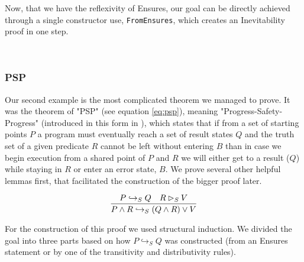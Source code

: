 Now, that we have the reflexivity of Ensures, our goal can be directly achieved through a single constructor use, \verb|FromEnsures|, which creates an Inevitability proof in one step.

\begin{code}
    \>[2]\AgdaSpace{}%
    \AgdaSymbol{:}\AgdaSpace{}%
    \AgdaSpace{}%
    \AgdaSpace{}%
    \AgdaSpace{}%
    \AgdaSpace{}%
    \AgdaOperator{\AgdaFunction{↪[}}\AgdaSpace{}%
    \AgdaSpace{}%
    \AgdaOperator{\AgdaFunction{]}}\AgdaSpace{}%
    \<%
    \\
    \>[2]\AgdaSpace{}%
    \AgdaSpace{}%
    \AgdaSymbol{=}\AgdaSpace{}%
    \AgdaSpace{}%
    \AgdaSymbol{(}\AgdaSpace{}%
    \AgdaSymbol{)}\<%
\end{code}
    
\subsubsection{PSP}

Our second example is the most complicated theorem we managed to prove. It was the theorem of "PSP" (see equation \ref{eq:psp}), meaning "Progress-Safety-Progress" (introduced in this form in \cite{Chandy1988ParallelPD}), which states that if from a set of starting points $P$ a program must eventually reach a set of result states $Q$ and the truth set of a given predicate $R$ cannot be left without entering $B$ than in case we begin execution from a shared point of $P$ and $R$ we will either get to a result ($Q$) while staying in $R$ or enter an error state, $B$. We prove several other helpful lemmas first, that facilitated the construction of the bigger proof later.

\begin{equation}
    \label{eq:psp}
    \infer{P \land R \hookrightarrow_S (Q \land R) \lor V}{P \hookrightarrow_S Q & R \rhd_S V}
\end{equation}


For the construction of this proof we used structural induction. We divided the goal into three parts based on how $P \hookrightarrow_S Q$ was constructed (from an Ensures statement or by one of the transitivity and distributivity rules).

